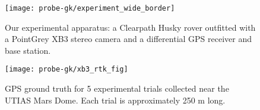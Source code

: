 \begin{table}
\centering
\caption{Comparison of average root mean squared errors (ARMSE) for rotational
  and translational components. Each trial is trained and tested from a
  particular category of raw data from the synthetic and KITTI datasets.}

\end{table}

\begin{figure}
    \centering
    \hspace*{0.25cm}
    \texttt{[image: probe-gk/experiment\_wide\_border]}
    \caption{Our experimental apparatus: a Clearpath Husky rover outfitted with a PointGrey XB3 stereo camera and a differential GPS receiver and base station.}
      \vspace{-0.5em}
   	    \label{fig:probe-gk_experiments}
\end{figure}

\begin{figure}
    \centering
	\texttt{[image: probe-gk/xb3\_rtk\_fig]}
    \caption{GPS ground truth for 5 experimental trials collected
      near the UTIAS Mars Dome. Each trial is approximately 250 m long.}
      \vspace{-0.5em}
    \label{fig:probe-gk_experiment_groundtruth}
\end{figure}

